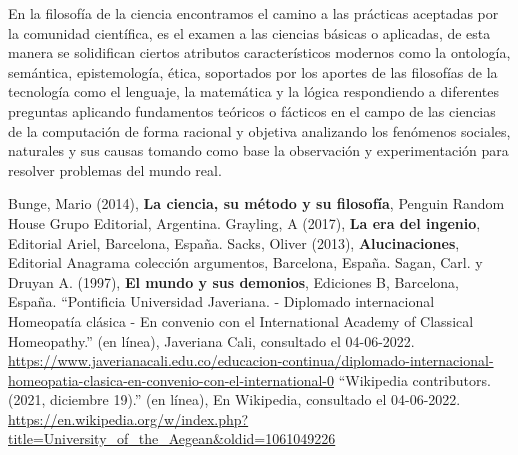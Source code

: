 \documentclass[letterpaper,12pt]{article}
\begin{document}
En la filosofía de la ciencia encontramos el camino a las prácticas aceptadas por la comunidad científica, es el examen a las ciencias básicas o aplicadas, de esta manera se solidifican ciertos atributos característicos modernos como la ontología, semántica, epistemología, ética, soportados por los aportes de las filosofías de la tecnología como el lenguaje, la matemática y la lógica respondiendo a diferentes preguntas aplicando fundamentos teóricos o fácticos en el campo de las ciencias de la computación de forma racional y objetiva analizando los fenómenos sociales, naturales y sus causas tomando como base la observación y experimentación para resolver problemas del mundo real.




\begin{thebibliography}{}
        Bunge, Mario (2014), \textbf{La ciencia, su método y su filosofía}, Penguin Random House Grupo Editorial, Argentina.
        Grayling, A (2017), \textbf{La era del ingenio}, Editorial Ariel, Barcelona, España.
        Sacks, Oliver (2013), \textbf{Alucinaciones}, Editorial Anagrama colección argumentos, Barcelona, España.
        Sagan, Carl. y Druyan A. (1997), \textbf{El mundo y sus demonios}, Ediciones B, Barcelona, España.
        ``Pontificia Universidad Javeriana. - Diplomado internacional Homeopatía clásica - En convenio con el International Academy of Classical Homeopathy.'' (en línea), Javeriana Cali, consultado el 04-06-2022. \\
        \url{https://www.javerianacali.edu.co/educacion-continua/diplomado-internacional-homeopatia-clasica-en-convenio-con-el-international-0} 
        ``Wikipedia contributors. (2021, diciembre 19).'' (en línea), En Wikipedia, consultado el 04-06-2022. \\
        \url{https://en.wikipedia.org/w/index.php?title=University_of_the_Aegean&oldid=1061049226}
\end{thebibliography}
\end{document}
